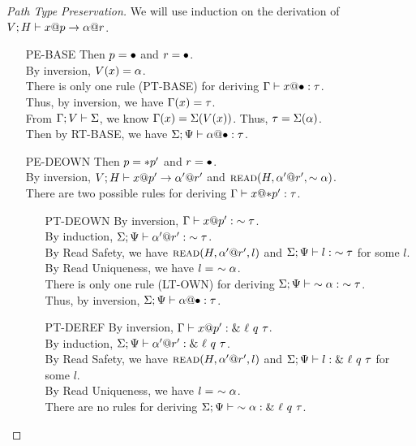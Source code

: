 \begin{proof}[Path Type Preservation]
  We will use induction on the derivation of ${V;H} \vdash {{x}@{p}} \to {{\alpha}@{r}}$.
  \begin{itemize}
    \item[PE-BASE] Then $p = \bullet$ and $r = \bullet$. \\
      By inversion, $V(x)=\alpha$. \\
      There is only one rule (\textsc{PT-BASE}) for deriving ${\Gamma} \vdash {{x}@{\bullet}} : {\tau}$. \\
      Thus, by inversion, we have $\Gamma(x)=\tau$. \\
      From $\Gamma;V\vdash\Sigma$, we know $\Gamma(x)=\Sigma(V(x))$. Thus, $\tau=\Sigma(\alpha)$. \\
      Then by \textsc{RT-BASE}, we have ${\Sigma;\Psi} \vdash {{\alpha}@{\bullet}} : {\tau}$.
    \item[PE-DEOWN] Then $p = *{p'}$ and $r = \bullet$. \\
      By inversion, ${V;H} \vdash {{x}@{p'}} \to {{\alpha'}@{r'}}$
      and $\textsc{read}({H},{{\alpha'}@{r'}},{\sim{\alpha}})$. \\
      There are two possible rules for deriving ${\Gamma} \vdash {{x}@{*{p'}}} : {\tau}$.
      \begin{itemize}
	\item[PT-DEOWN]
	  By inversion, ${\Gamma} \vdash {{x}@{p'}} : {\sim{\tau}}$. \\
	  By induction, ${\Sigma;\Psi} \vdash {{\alpha'}@{r'}} : {\sim{\tau}}$. \\
	  By Read Safety, we have $\textsc{read}({H},{{\alpha'}@{r'}},{l})$
	  and ${\Sigma;\Psi} \vdash {l} : {\sim{\tau}}$ for some $l$. \\
	  By Read Uniqueness, we have $l =\ \own{\ga}$. \\
	  There is only one rule (\textsc{LT-OWN}) for deriving 
	  ${\Sigma;\Psi} \vdash {\sim{\alpha}} : {\sim{\tau}}$. \\
	  Thus, by inversion, ${\Sigma;\Psi} \vdash {{\alpha}@{\bullet}} : {\tau}$.
	\item[PT-DEREF]
	  By inversion, ${\Gamma} \vdash {{x}@{p'}} : {\&~{{\ell}~{q}~{\tau}}}$. \\
	  By induction, ${\Sigma;\Psi} \vdash {{\alpha'}@{r'}} : {\&~{{\ell}~{q}~{\tau}}}$. \\
	  By Read Safety, we have $\textsc{read}({H},{{\alpha'}@{r'}},{l})$
	  and ${\Sigma;\Psi} \vdash {l} : {\&~{{\ell}~{q}~{\tau}}}$ for some $l$. \\
	  By Read Uniqueness, we have $l =\ \own{\ga}$. \\
	  There are no rules for deriving
	  ${\Sigma;\Psi} \vdash {\sim{\alpha}} : {\&~{{\ell}~{q}~{\tau}}}$. \\

\end{itemize}
\end{itemize}
\end{proof}
